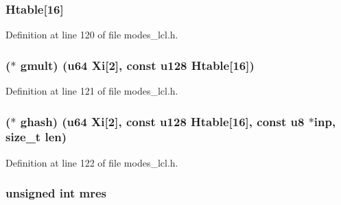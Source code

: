 \subsubsection[{\texorpdfstring{Htable}{Htable}}]{ Htable\mbox{[}16\mbox{]}}\hypertarget{structgcm128__context_a9bf17e349eb0ed58f0d87c09c31c5638}{}\label{structgcm128__context_a9bf17e349eb0ed58f0d87c09c31c5638}


Definition at line 120 of file modes\+\_\+lcl.\+h.

\subsubsection[{\texorpdfstring{gmult}{gmult}}]{($\ast$ gmult) ({\bf u64} {\bf Xi}\mbox{[}2\mbox{]}, const {\bf u128} {\bf Htable}\mbox{[}16\mbox{]})}\hypertarget{structgcm128__context_a4e1d8ef99e397014653f47916ccba265}{}\label{structgcm128__context_a4e1d8ef99e397014653f47916ccba265}


Definition at line 121 of file modes\+\_\+lcl.\+h.

\subsubsection[{\texorpdfstring{ghash}{ghash}}]{($\ast$ ghash) ({\bf u64} {\bf Xi}\mbox{[}2\mbox{]}, const {\bf u128} {\bf Htable}\mbox{[}16\mbox{]}, const {\bf u8} $\ast$inp, size\+\_\+t {\bf len})}\hypertarget{structgcm128__context_af02c58fd6e410c047d2d13bb347d7cb3}{}\label{structgcm128__context_af02c58fd6e410c047d2d13bb347d7cb3}


Definition at line 122 of file modes\+\_\+lcl.\+h.

\subsubsection[{\texorpdfstring{mres}{mres}}]{\setlength{\rightskip}{0pt plus 5cm}unsigned int mres}\hypertarget{structgcm128__context_a61af57265541d7d07a820f88293ea0e4}{}\label{structgcm128__context_a61af57265541d7d07a820f88293ea0e4}


